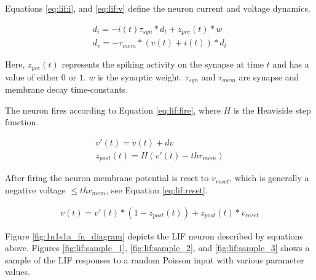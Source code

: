     Equations \ref{eq:lif:i}, and \ref{eq:lif:v} define the neuron current and
    voltage dynamics.
    
    \begin{align}
      d_{i} = -i(t) \tau_{syn} * d_t + z_{pre}(t) * w \label{eq:lif:i} \\
      d_{v} = -\tau_{mem} * (v(t) + i(t)) * d_t \label{eq:lif:v}
    \end{align}

    Here, $z_{pre}(t)$ represents the spiking activity on the synapse at time
    $t$ and has a value of either $0$ or $1$. $w$ is the synaptic
    weight. $\tau_{syn}$ and $\tau_{mem}$ are synapse and membrane decay
    time-constants.

    The neuron fires according to Equation \ref{eq:lif:fire}, where $H$ is the
    Heaviside step function.

    \begin{align}
      v'(t) = v(t) + dv \label{eq:lif:v_update} \\
      z_{post}(t) = H(v'(t) - thr_{mem}) \label{eq:lif:fire}
    \end{align}

    After firing the neuron membrane potential is reset to $v_{reset}$, which is
    generally a negative voltage $\leq thr_{mem}$, see Equation \ref{eq:lif:reset}.

    \begin{align}
      v(t) = v'(t) * (1 - z_{post}(t)) + z_{post}(t) * v_{reset} \label{eq:lif:reset}
    \end{align}

    Figure \ref{fig:1n1s1a_fn_diagram} depicts the LIF neuron described by
    equations above. Figures \ref{fig:lif:sample_1}, \ref{fig:lif:sample_2}, and
    \ref{fig:lif:sample_3} shows a sample of the LIF responses to a random
    Poisson input with various parameter values.




